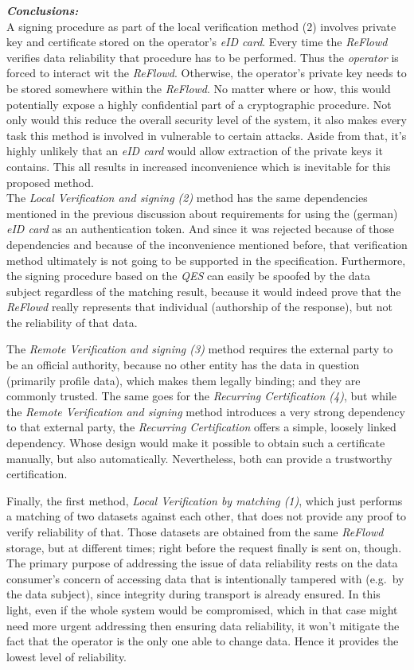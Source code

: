 \documentclass[12pt,english,a4paper,titlepage,cleardoublepage=empty,dottedtoc]{report}
\begin{document}
\emph{\textbf{Conclusions:}} ~\\
A signing procedure as part of the local verification method (2)
involves private key and certificate stored on the operator's \emph{eID
card}. Every time the \emph{ReFlowd} verifies data reliability that
procedure has to be performed. Thus the \emph{operator} is forced to
interact wit the \emph{ReFlowd}. Otherwise, the operator's private key
needs to be stored somewhere within the \emph{ReFlowd}. No matter where
or how, this would potentially expose a highly confidential part of a
cryptographic procedure. Not only would this reduce the overall security
level of the system, it also makes every task this method is involved in
vulnerable to certain attacks. Aside from that, it's highly unlikely
that an \emph{eID card} would allow extraction of the private keys it
contains. This all results in increased inconvenience which is
inevitable for this proposed method.\\
The \emph{Local Verification and signing (2)} method has the same
dependencies mentioned in the previous discussion about requirements for
using the (german) \emph{eID card} as an authentication token. And since
it was rejected because of those dependencies and because of the
inconvenience mentioned before, that verification method ultimately is
not going to be supported in the specification. Furthermore, the signing
procedure based on the \emph{QES} can easily be spoofed by the data
subject regardless of the matching result, because it would indeed prove
that the \emph{ReFlowd} really represents that individual (authorship of
the response), but not the reliability of that data.

The \emph{Remote Verification and signing (3)} method requires the
external party to be an official authority, because no other entity has
the data in question (primarily profile data), which makes them legally
binding; and they are commonly trusted. The same goes for the
\emph{Recurring Certification (4)}, but while the \emph{Remote
Verification and signing} method introduces a very strong dependency to
that external party, the \emph{Recurring Certification} offers a simple,
loosely linked dependency. Whose design would make it possible to obtain
such a certificate manually, but also automatically. Nevertheless, both
can provide a trustworthy certification.

Finally, the first method, \emph{Local Verification by matching (1)},
which just performs a matching of two datasets against each other, that
does not provide any proof to verify reliability of that. Those datasets
are obtained from the same \emph{ReFlowd} storage, but at different
times; right before the request finally is sent on, though.\\
The primary purpose of addressing the issue of data reliability rests on
the data consumer's concern of accessing data that is intentionally
tampered with (e.g.~by the data subject), since integrity during
transport is already ensured. In this light, even if the whole system
would be compromised, which in that case might need more urgent
addressing then ensuring data reliability, it won't mitigate the fact
that the operator is the only one able to change data. Hence it provides
the lowest level of reliability.
\end{document}

